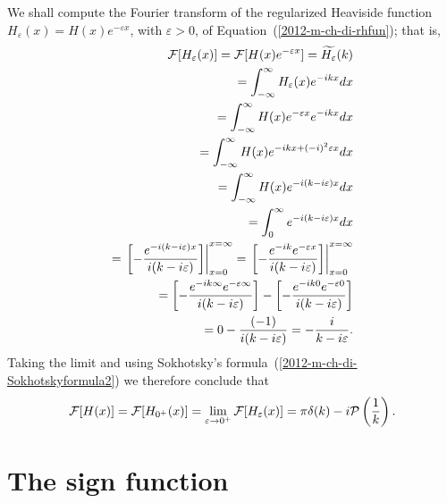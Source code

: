 {\color{OliveGreen}
\bproof
We shall compute the Fourier transform
 of the regularized Heaviside function
$H_\varepsilon (x) =H(x)e^{-\varepsilon x}$, with $\varepsilon >0$, of Equation~(\ref{2012-m-ch-di-rhfun}); that is,\cite[-10mm]{sommer-di}
\begin{equation}
\begin{split}
 {\cal F}[H_\varepsilon (x)] =
 {\cal F}[H(x)e^{-\varepsilon x}]
=\widetilde{H_\varepsilon }(k)
\\
=   \int_{-\infty}^\infty  H_\varepsilon (x) e^{-i{kx}} dx
\\
=   \int_{-\infty}^\infty  H(x)e^{-\varepsilon x}  e^{-i{kx}} dx
\\
=   \int_{-\infty}^\infty  H(x) e^{-i{kx}+(-i)^2\varepsilon x}  dx
\\
=   \int_{-\infty}^\infty  H(x) e^{-i(k - i \varepsilon ) x}  dx
\\
=   \int_{0}^\infty  e^{-i(k - i \varepsilon ) x}  dx
\\
=  \left. \left[ -\frac{ e^{-i(k - i \varepsilon ) x}}{i(k - i \varepsilon ) } \right] \right|_{x=0}^{x=\infty}
=  \left. \left[ -\frac{ e^{-ik} e^{- \varepsilon   x}}{i(k - i \varepsilon ) } \right] \right|_{x=0}^{x=\infty}
\\
=  \left[ -\frac{ e^{-ik\infty} e^{- \varepsilon  \infty}}{i(k - i \varepsilon ) } \right]
-  \left[ -\frac{ e^{-ik0} e^{- \varepsilon  0}}{i(k - i \varepsilon ) } \right]
\\
=    0 - \frac{ (-1)}{i(k - i \varepsilon ) }
=     -\frac{ i}{k - i \varepsilon  }
.
\end{split}
\end{equation}
Taking the limit and using
Sokhotsky's  formula~(\ref{2012-m-ch-di-Sokhotskyformula2})
we therefore conclude that
\begin{equation}
 {\cal F}[H(x)] =
 {\cal F}[H_{0^+} (x)] =
 \lim_{\varepsilon \rightarrow 0^+} {\cal F}[H_\varepsilon (x)] =
  \pi \delta (k)   -i {\cal P} \left(\frac{1}{k}\right)
.
\label{2012-m-ch-di-fthfu}
\end{equation}

\eproof
}




\section{The sign function}

